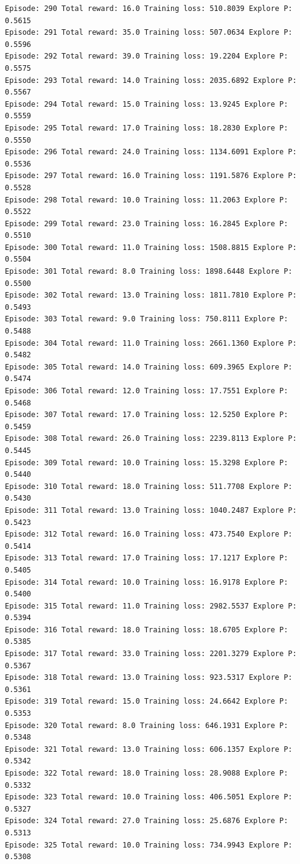 \documentclass[11pt]{article}
\begin{document}
\begin{Verbatim}[commandchars=\\\{\}]
Episode: 290 Total reward: 16.0 Training loss: 510.8039 Explore P: 0.5615
Episode: 291 Total reward: 35.0 Training loss: 507.0634 Explore P: 0.5596
Episode: 292 Total reward: 39.0 Training loss: 19.2204 Explore P: 0.5575
Episode: 293 Total reward: 14.0 Training loss: 2035.6892 Explore P: 0.5567
Episode: 294 Total reward: 15.0 Training loss: 13.9245 Explore P: 0.5559
Episode: 295 Total reward: 17.0 Training loss: 18.2830 Explore P: 0.5550
Episode: 296 Total reward: 24.0 Training loss: 1134.6091 Explore P: 0.5536
Episode: 297 Total reward: 16.0 Training loss: 1191.5876 Explore P: 0.5528
Episode: 298 Total reward: 10.0 Training loss: 11.2063 Explore P: 0.5522
Episode: 299 Total reward: 23.0 Training loss: 16.2845 Explore P: 0.5510
Episode: 300 Total reward: 11.0 Training loss: 1508.8815 Explore P: 0.5504
Episode: 301 Total reward: 8.0 Training loss: 1898.6448 Explore P: 0.5500
Episode: 302 Total reward: 13.0 Training loss: 1811.7810 Explore P: 0.5493
Episode: 303 Total reward: 9.0 Training loss: 750.8111 Explore P: 0.5488
Episode: 304 Total reward: 11.0 Training loss: 2661.1360 Explore P: 0.5482
Episode: 305 Total reward: 14.0 Training loss: 609.3965 Explore P: 0.5474
Episode: 306 Total reward: 12.0 Training loss: 17.7551 Explore P: 0.5468
Episode: 307 Total reward: 17.0 Training loss: 12.5250 Explore P: 0.5459
Episode: 308 Total reward: 26.0 Training loss: 2239.8113 Explore P: 0.5445
Episode: 309 Total reward: 10.0 Training loss: 15.3298 Explore P: 0.5440
Episode: 310 Total reward: 18.0 Training loss: 511.7708 Explore P: 0.5430
Episode: 311 Total reward: 13.0 Training loss: 1040.2487 Explore P: 0.5423
Episode: 312 Total reward: 16.0 Training loss: 473.7540 Explore P: 0.5414
Episode: 313 Total reward: 17.0 Training loss: 17.1217 Explore P: 0.5405
Episode: 314 Total reward: 10.0 Training loss: 16.9178 Explore P: 0.5400
Episode: 315 Total reward: 11.0 Training loss: 2982.5537 Explore P: 0.5394
Episode: 316 Total reward: 18.0 Training loss: 18.6705 Explore P: 0.5385
Episode: 317 Total reward: 33.0 Training loss: 2201.3279 Explore P: 0.5367
Episode: 318 Total reward: 13.0 Training loss: 923.5317 Explore P: 0.5361
Episode: 319 Total reward: 15.0 Training loss: 24.6642 Explore P: 0.5353
Episode: 320 Total reward: 8.0 Training loss: 646.1931 Explore P: 0.5348
Episode: 321 Total reward: 13.0 Training loss: 606.1357 Explore P: 0.5342
Episode: 322 Total reward: 18.0 Training loss: 28.9088 Explore P: 0.5332
Episode: 323 Total reward: 10.0 Training loss: 406.5051 Explore P: 0.5327
Episode: 324 Total reward: 27.0 Training loss: 25.6876 Explore P: 0.5313
Episode: 325 Total reward: 10.0 Training loss: 734.9943 Explore P: 0.5308

\end{Verbatim}
\end{document}
